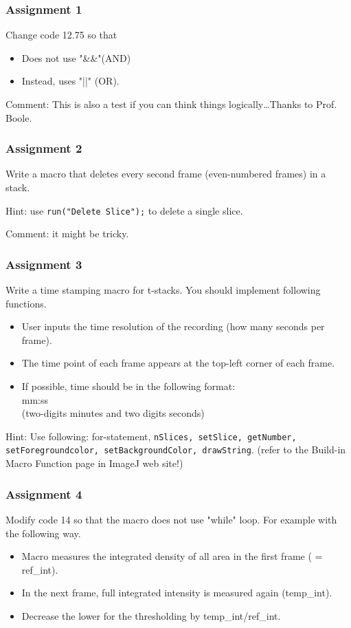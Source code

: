 \documentclass[11pt,a4paper,oneside]{report}
\newcommand{\ilcom}[1]{\texttt{\small#1}}
\begin{document}
\subsubsection{Assignment 1}
Change code 12.75 so that 
\begin{itemize}
\item Does not use "\&\&"(AND) 
\item Instead, uses "||" (OR). 
\end{itemize}

Comment: This is also a test if you can think things logically\ldots Thanks to Prof. Boole. 

\subsubsection{Assignment 2}  
Write a macro that deletes every second frame (even-numbered frames) in a stack. 

Hint: use \ilcom{run("Delete Slice");} to delete a single slice. 

Comment: it might be tricky.

\subsubsection{Assignment 3} 
Write a time stamping macro for t-stacks. You should implement following functions. 
\begin{itemize}
\item User inputs the time resolution of the recording (how many seconds per frame).
\item The time point of each frame appears at the top-left corner of each frame.  
\item If possible, time should be in the following format: \\
mm:ss \\
(two-digits minutes and two digits seconds)
\end{itemize}
Hint: Use following: for-statement, 
\ilcom{nSlices, setSlice, getNumber,\\ setForegroundcolor, setBackgroundColor, drawString}. 
(refer to the Build-in Macro Function page in ImageJ web site!)

\subsubsection{Assignment 4} 
Modify code 14 so that the macro does not use "while" loop. For example with the following way. 
\begin{itemize}
\item Macro measures the integrated density of all area in the first frame ( = ref\_int).
\item In the next frame, full integrated intensity is measured again (temp\_int).
\item Decrease the lower for the thresholding by temp\_int/ref\_int.
 \end{itemize}
\end{document}
